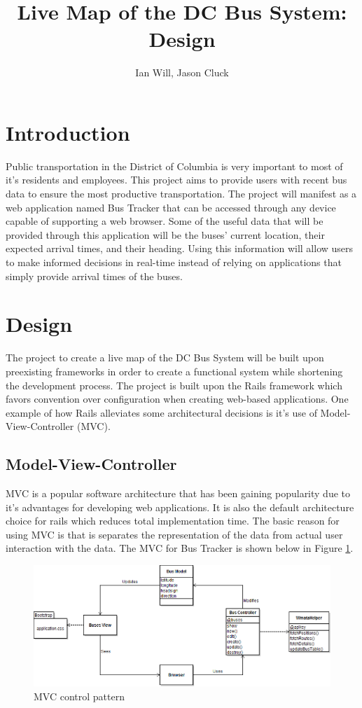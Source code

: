 \documentclass[12pt]{article}
\title{Live Map of the DC Bus System: Design}
\author{Ian Will, Jason Cluck}
\date{}
\begin{document}
\maketitle

\section*{Introduction}
	Public transportation in the District of Columbia is very important to most of it's residents and employees.  This project aims to provide users with recent bus data to ensure the most productive transportation.  The project will manifest as a web application named Bus Tracker that can be accessed through any device capable of supporting a web browser.  Some of the useful data that will be provided through this application will be the buses' current location, their expected arrival times, and their heading.  Using this information will allow users to make informed decisions in real-time instead of relying on applications that simply provide arrival times of the buses.

\section*{Design}

The project to create a live map of the DC Bus System will be built upon preexisting frameworks in order to create a functional system while shortening the development process.  The project is built upon the Rails framework which favors convention over configuration when creating web-based applications.  One example of how Rails alleviates some architectural decisions is it's use of Model-View-Controller (MVC).

\subsection*{Model-View-Controller}
MVC is a popular software architecture that has been gaining popularity due to it's advantages for developing web applications.  It is also the default architecture choice for rails which reduces total implementation time.  The basic reason for using MVC is that is separates the representation of the data from actual user interaction with the data. The MVC for Bus Tracker is shown below in Figure \ref{fig:MVC}.

\begin{figure}[ht]
	\centerline{\includegraphics[scale=0.55]{busTrackerUML.png}}
	\caption{MVC control pattern}
	\label{fig:MVC}
\end{figure}
\end{document}
